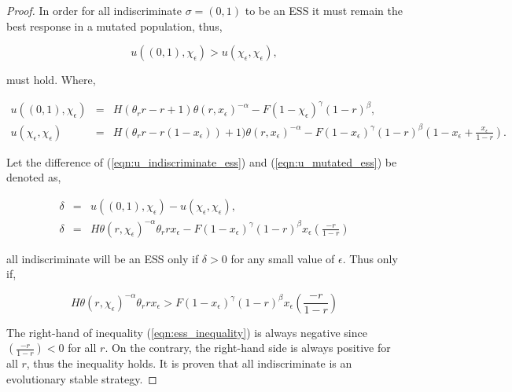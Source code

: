 \documentclass[10pt]{article}
\begin{document}
\begin{proof}
	In order for all indiscriminate \(\sigma=(0,1)\) to be an ESS it must
	remain the best response in a mutated population, thus,

	\begin{equation}\label{eqn:evolutionary_stability}
		u((0, 1), \chi_\epsilon) > u(\chi_\epsilon, \chi_\epsilon),
	\end{equation}

	must hold. Where, 

	\begin{eqnarray}
		\label{eqn:u_indiscriminate_ess}
		u((0, 1), \chi_\epsilon)  &=& H(\theta_rr - r + 1)\theta(r, x_\epsilon) ^{-\alpha}
		- F(1 - \chi_\epsilon) ^ {\gamma} (1- r) ^ {\beta},
		\\
		\label{eqn:u_mutated_ess}
		u(\chi_\epsilon, \chi_\epsilon) &=& H(\theta_rr - r(1 - x_\epsilon))+ 1)\theta(r,
		x_\epsilon) ^{-\alpha} - F(1 - x_\epsilon) ^ {\gamma} (1- r) ^ {\beta}(1 - 
		x_\epsilon + \frac{x_\epsilon}{1- r}).
\end{eqnarray}

	Let the difference of (\ref{eqn:u_indiscriminate_ess}) and (\ref{eqn:u_mutated_ess})
	be denoted as, 

	\begin{eqnarray}
		\label{eqn:delta}
	 	\delta &=& u((0, 1), \chi_\epsilon) - u(\chi_\epsilon, \chi_\epsilon),
	 	\\
	 	\label{eqn:sub_to_delta}
	 	\delta &=& H\theta(r, \chi_\epsilon) ^{-\alpha} \theta_r r x_\epsilon -
	 	F(1 - x_\epsilon) ^ {\gamma} (1- r) ^ {\beta}x_\epsilon(\frac{-r}{1- r})
	\end{eqnarray}

	all indiscriminate will be an ESS only if \(\delta >0 \) for any small 
	value of \(\epsilon\). Thus only if,

	\begin{equation}
	\label{eqn:ess_inequality}
		H\theta(r, \chi_\epsilon) ^{-\alpha} \theta_r r x_\epsilon > F
	 	(1 - x_\epsilon) ^ {\gamma} (1- r) ^ {\beta} x_\epsilon(\frac{-r}{1- r})
	\end{equation}

	The right-hand of inequality (\ref{eqn:ess_inequality}) is always negative
	since \((\frac{-r}{1- r}) < 0\)  for all \(r\). On the contrary, the right-hand 
	side is always positive for all \(r\), thus the inequality holds. 
	It is proven that all indiscriminate is an evolutionary stable strategy.
\end{proof}
\end{document}

